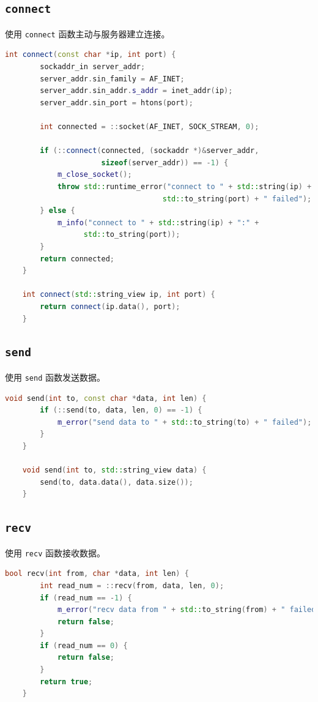 \documentclass{article}
\begin{document}
\subsection{\texttt{connect}}

使用 \texttt{connect} 函数主动与服务器建立连接。

\begin{lstlisting}[language=C++, title=connect]
    int connect(const char *ip, int port) {
        sockaddr_in server_addr;
        server_addr.sin_family = AF_INET;
        server_addr.sin_addr.s_addr = inet_addr(ip);
        server_addr.sin_port = htons(port);

        int connected = ::socket(AF_INET, SOCK_STREAM, 0);

        if (::connect(connected, (sockaddr *)&server_addr,
                      sizeof(server_addr)) == -1) {
            m_close_socket();
            throw std::runtime_error("connect to " + std::string(ip) + ":" +
                                    std::to_string(port) + " failed");
        } else {
            m_info("connect to " + std::string(ip) + ":" +
                  std::to_string(port));
        }
        return connected;
    }

    int connect(std::string_view ip, int port) {
        return connect(ip.data(), port);
    }
\end{lstlisting}

\subsection{\texttt{send}}

使用 \texttt{send} 函数发送数据。

\begin{lstlisting}[language=C++, title=send]
    void send(int to, const char *data, int len) {
        if (::send(to, data, len, 0) == -1) {
            m_error("send data to " + std::to_string(to) + " failed");
        }
    }

    void send(int to, std::string_view data) {
        send(to, data.data(), data.size());
    }
\end{lstlisting}

\subsection{\texttt{recv}}

使用 \texttt{recv} 函数接收数据。

\begin{lstlisting}[language=C++, title=recv]
    bool recv(int from, char *data, int len) {
        int read_num = ::recv(from, data, len, 0);
        if (read_num == -1) {
            m_error("recv data from " + std::to_string(from) + " failed");
            return false;
        }
        if (read_num == 0) {
            return false;
        }
        return true;
    }
\end{lstlisting}
\end{document}
